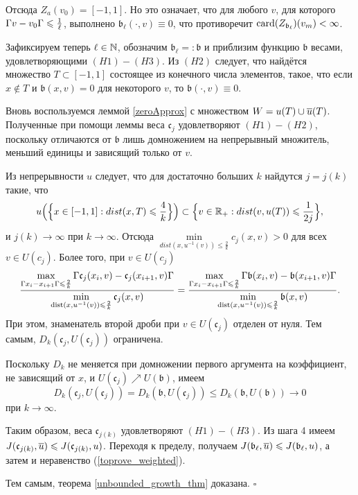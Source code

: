 Отсюда $Z_{a}(v_0) = [-1, 1]$.
Но это означает, что для любого $v$, для которого $\abs{v - v_0} \le \frac{1}{\ell}$,
выполнено $\mathfrak b_{\ell}(\cdot, v) \equiv 0$,
что противоречит $\operatorname{card}(Z_{\mathfrak b_{\ell}})(v_m) < \infty$.

Зафиксируем теперь $\ell \in \mathbb N$, обозначим $\mathfrak b_{\ell} =: \mathfrak b$
и приблизим функцию $\mathfrak b$ весами, удовлетворяющими $(H1)-(H3)$.
Из $(H2)$ следует, что найдётся множество $T \subset [-1, 1]$
состоящее из конечного числа элементов, такое, что
если $x \not\in T$ и $\mathfrak b(x, v) = 0$ для некоторого $v$, то $\mathfrak b(\cdot, v) \equiv 0$.

Вновь воспользуемся леммой \ref{zeroApprox} с множеством $W = u(T) \cup \mon{u}(T)$.
Полученные при помощи леммы веса $\mathfrak c_j$ удовлетворяют $(H1)-(H2)$,
поскольку отличаются от $\mathfrak b$ лишь домножением на непрерывный множитель,
меньший единицы и зависящий только от $v$.

Из непрерывности $u$ следует, что для достаточно больших $k$ найдутся $j = j(k)$ такие, что
$$
u \Bigl( \Bigl\{ x \in [-1, 1]: dist(x, T) \le \frac{4}{k} \Bigr\} \Bigr) \subset \Bigl\{ v \in \Real_+: dist(v, u(T)) \le \frac{1}{2j} \Bigr\},
$$
и $j(k) \to \infty$ при $k \to \infty$.
Отсюда $\min\limits_{dist(x, u^{-1}(v)) \le \frac{2}{k}} c_j(x, v) > 0$ для всех $v \in U(c_j)$.
Более того, при $v \in U(c_j)$
$$
\frac{\max\limits_{\abs{x_i - x_{i + 1}} \le \frac{2}{k}} \abs{\mathfrak c_j(x_i, v) - \mathfrak c_j(x_{i + 1}, v)}}
{\min\limits_{\dist(x, u^{-1}(v)) \le \frac{2}{k}} \mathfrak c_j(x, v)}
=\frac{\max\limits_{\abs{x_i - x_{i + 1}} \le \frac{2}{k}} \abs{\mathfrak b(x_i, v) - \mathfrak b(x_{i + 1}, v)}}
{\min\limits_{\dist(x, u^{-1}(v)) \le \frac{2}{k}} \mathfrak b(x, v)}.
$$
При этом, знаменатель второй дроби при $v \in U(\mathfrak c_j)$ отделен от нуля.
Тем самым, $D_k(\mathfrak c_j, U(\mathfrak c_j))$ ограничена.

Поскольку $D_k$ не меняется при домножении первого аргумента на коэффициент, не зависящий от $x$,
и $U(\mathfrak c_j) \nearrow U(\mathfrak b)$, имеем
$$
D_k(\mathfrak c_j, U(\mathfrak c_j)) = D_k(\mathfrak b, U(\mathfrak c_j)) \le D_k(\mathfrak b, U(\mathfrak b)) \to 0
$$
при $k \to \infty$.

Таким образом, веса $\mathfrak c_{j(k)}$ удовлетворяют $(H1)-(H3)$.
Из шага 4 имеем $\IWg(\mathfrak c_{j(k)}, \mon{u}) \le \IWg(\mathfrak c_{j(k)}, u)$.
Переходя к пределу, получаем $\IWg(\mathfrak b_{\ell}, \mon{u}) \le \IWg(\mathfrak b_{\ell}, u)$,
а затем и неравенство (\ref{toprove_weighted}).

Тем самым, теорема \ref{unbounded_growth_thm} доказана.
\hfill $\square$
